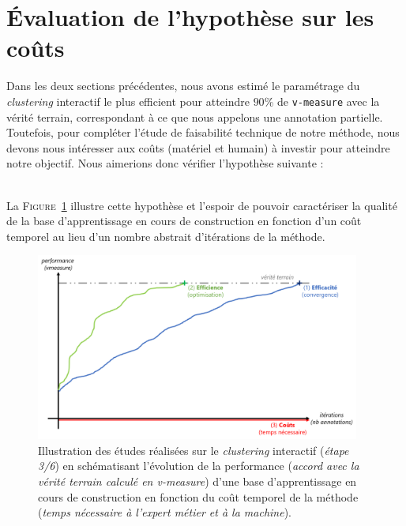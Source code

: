 \section{Évaluation de l'hypothèse sur les coûts}
\label{section:4.3-HYPOTHESE-COUTS}

	Dans les deux sections précédentes, nous avons estimé le paramétrage du \textit{clustering} interactif le plus efficient pour atteindre $90$\% de \texttt{v-measure} avec la vérité terrain, correspondant à ce que nous appelons une annotation partielle.
	Toutefois, pour compléter l'étude de faisabilité technique de notre méthode, nous devons nous intéresser aux coûts (matériel et humain) à investir pour atteindre notre objectif.
	Nous aimerions donc vérifier l'hypothèse suivante :
	
	\begin{tcolorbox}[
		title=\faVial~\textbf{Hypothèse sur les coûts}~\faVial,
		colback=colorTcolorboxHypothesis!15,
		colframe=colorTcolorboxHypothesis!75,
		width=\linewidth
	]
		 \\
		
		La \textsc{Figure~\ref{figure:4.3-HYPOTHESE-COUTS}} illustre cette hypothèse et l'espoir de pouvoir caractériser la qualité de la base d'apprentissage en cours de construction en fonction d'un coût temporel au lieu d'un nombre abstrait d'itérations de la méthode. 
		\begin{figure}[H]  %
			\centering
			\includegraphics[width=0.95\textwidth]{figures/hypotheses-03-couts}
			\caption{
				Illustration des études réalisées sur le \textit{clustering} interactif (\textit{étape 3/6}) en schématisant l'évolution de la performance (\textit{accord avec la vérité terrain calculé en v-measure}) d'une base d'apprentissage en cours de construction en fonction du coût temporel de la méthode (\textit{temps nécessaire à l'expert métier et à la machine}).
			}
			\label{figure:4.3-HYPOTHESE-COUTS}
		\end{figure}
	\end{tcolorbox}

